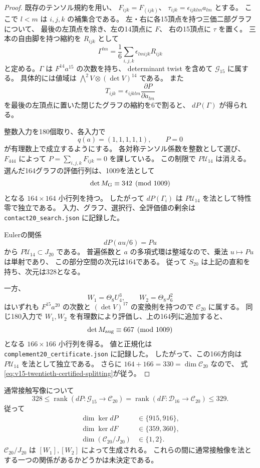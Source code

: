 \begin{proof}
既存のテンソル規約を用い、
$F_{ijk}=F_{(ijk)}$、
$\tau_{ijk}=\epsilon_{ijklm}a_{lm}$ とする。
ここで $l<m$ は $i,j,k$ の補集合である。
左・右に各15頂点を持つ三価二部グラフについて、
最後の左頂点を除き、左の14頂点に $F$、
右の15頂点に $\tau$ を置く。
三本の自由脚を持つ縮約を $R_{ijk}$ として
\[
 \Gamma^{lm}=\frac16\sum_{i,j,k}\epsilon_{lmijk}R_{ijk}
\]
と定める。$\Gamma$ は $F^{14}a^{15}$ の次数を持ち、
determinant twist を含めて $\mathcal G_{15}$ に属する。
具体的には値域は $\bigwedge^2V\otimes(\det V)^{14}$ である。
また
\[
 T_{ijk}=\epsilon_{ijklm}\frac{\partial P}{\partial a_{lm}}
\]
を最後の左頂点に置いた閉じたグラフの縮約を6で割ると、
$dP(\Gamma)$ が得られる。

整数入力を180個取り、各入力で
\[
              q(a)=(1,1,1,1,1),\qquad P=0
\]
が有理数上で成立するようにする。
各対称テンソル係数を整数として選び、
$F_{444}$ によって $P=\sum_{i,j,k}F_{ijk}=0$ を課している。
この制限で $P\mathcal U_{14}$ は消える。
選んだ164グラフの評価行列は、1009を法として
\[
                  \det M_{\rm G}\equiv342\pmod{1009}
\]
となる $164\times164$ 小行列を持つ。
したがって $dP(\Gamma_i)$ は $P\mathcal U_{14}$ を法として特性零で独立である。
入力、グラフ、選択行、全評価値の剰余は
\texttt{contact20\_search.json} に記録した。

Eulerの関係
\[
                         dP(au/6)=Pu
\]
から $P\mathcal U_{14}\subset J_{20}$ である。
普遍係数と $a$ の多項式環は整域なので、乗法 $u\mapsto Pu$ は単射であり、
この部分空間の次元は164である。
従って $S_{20}$ は上記の直和を持ち、次元は328となる。

一方、
\[
             W_1=\Theta_8U_4^3,\qquad W_2=\Theta_8J_6^2
\]
はいずれも $F^{15}a^{20}$ の次数と $(\det V)^{17}$ の変換則を持つので
$\mathcal C_{20}$ に属する。
同じ180入力で $W_1,W_2$ を有理数により評価し、上の164列に追加すると、
\[
                  \det M_{\rm aug}\equiv667\pmod{1009}
\]
となる $166\times166$ 小行列を得る。
値と正規化は \texttt{complement20\_certificate.json} に記録した。
したがって、この166方向は $P\mathcal U_{14}$ を法として独立である。
さらに $164+166=330=\dim\mathcal C_{20}$ なので、
式\eqref{eq:v15-twentieth-certified-splitting}が従う。
\end{proof}

\begin{proposition}[通常20次階数の確定した範囲]
\label{prop:v15-twentieth-contact-rank-bounds}
通常接触写像について
\[
 328\le
 \operatorname{rank}(dP:\mathcal G_{15}\to\mathcal C_{20})
 =
 \operatorname{rank}(dF:\mathcal D_{16}\to\mathcal C_{20})
 \le329.
\]
従って
\[
 \begin{split}
 \dim\ker dP&\in\{915,916\},\\
 \dim\ker dF&\in\{359,360\},\\
 \dim(\mathcal C_{20}/J_{20})&\in\{1,2\}.
 \end{split}
\]
$\mathcal C_{20}/J_{20}$ は $[W_1],[W_2]$ によって生成される。
これらの間に通常接触像を法とする一つの関係があるかどうかは未決定である。
\end{proposition}

